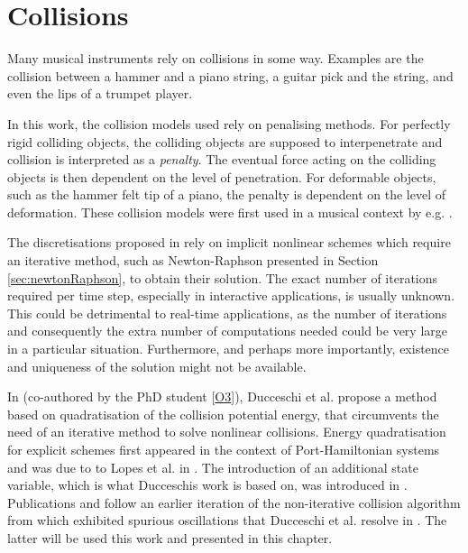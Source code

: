 \chapter{Collisions}\label{ch:collisions}
Many musical instruments rely on collisions in some way. Examples are the collision between a hammer and a piano string, a guitar pick and the string, and even the lips of a trumpet player. 

In this work, the collision models used rely on penalising methods. For perfectly rigid colliding objects, the colliding objects are supposed to interpenetrate and collision is interpreted as a \textit{penalty}. The eventual force acting on the colliding objects is then dependent on the level of penetration. For deformable objects, such as the hammer felt tip of a piano, the penalty is dependent on the level of deformation. These collision models were first used in a musical context by e.g. \cite{Chatziioannou2013, Bilbao2014}.

The discretisations proposed in \cite{Chatziioannou2013, Bilbao2014} rely on implicit nonlinear schemes which require an iterative method, such as Newton-Raphson presented in Section \ref{sec:newtonRaphson}, to obtain their solution. 
The exact number of iterations required per time step, especially in interactive applications, is usually unknown. This could be detrimental to real-time applications, as the number of iterations and consequently the extra number of computations needed could be very large in a particular situation. Furthermore, and perhaps more importantly, existence and uniqueness of the solution might not be available. 

In \cite{Ducceschi2021} (co-authored by the PhD student [\hyperref[ch:listOfPublications]{O3}]), Ducceschi et al. propose a method based on quadratisation of the collision potential energy, that circumvents the need of an iterative method to solve nonlinear collisions. Energy quadratisation for explicit schemes first appeared in the context of Port-Hamiltonian systems and was due to to Lopes et al. in \cite{Lopes2015}. The introduction of an additional state variable, which is what Ducceschis work is based on, was introduced in \cite{Yang2017, Jiang2019}. Publications \citeP[D] and \citeP[E] follow an earlier iteration of the non-iterative collision algorithm from \cite{Ducceschi2019, Bilbao2019} which exhibited spurious oscillations that Ducceschi et al. resolve in \cite{Ducceschi2021}. The latter will be used this work and presented in this chapter. 

